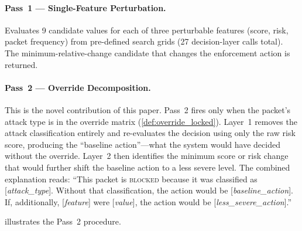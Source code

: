 \documentclass[preprint,12pt,authoryear]{elsarticle}
\begin{document}
\paragraph{Pass~1 --- Single-Feature Perturbation.}
Evaluates 9 candidate values for each of three perturbable features (score,
risk, packet frequency) from pre-defined search grids (27 decision-layer calls
total). The minimum-relative-change candidate that changes the enforcement action
is returned.

\paragraph{Pass~2 --- Override Decomposition.}
This is the novel contribution of this paper. Pass~2 fires only when the
packet's attack type is in the override matrix (\cref{def:override_locked}).
Layer~1 removes the attack classification entirely and re-evaluates the decision
using only the raw risk score, producing the ``baseline action''---what the
system would have decided without the override. Layer~2 then identifies the
minimum score or risk change that would further shift the baseline action to a
less severe level. The combined explanation reads: ``This packet is
\textsc{blocked} because it was classified as [\emph{attack\_type}]. Without
that classification, the action would be [\emph{baseline\_action}]. If,
additionally, [\emph{feature}] were [\emph{value}], the action would be
[\emph{less\_severe\_action}].''

 illustrates the Pass~2 procedure.
\end{document}
